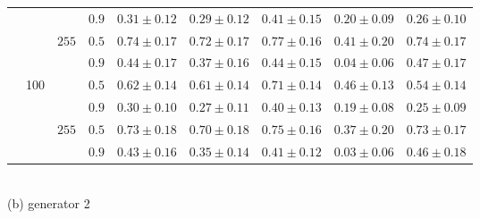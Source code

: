 \documentclass[graybox]{svmult}
\begin{document}
\begin{table}
\begin{tabular}{c|c|c|c|ccccc}
&&& $0.9$ & $0.31\pm0.12$ & $0.29\pm0.12$ & $\bm{0.41\pm0.15}$ & $0.20\pm0.09$ & $0.26\pm0.10$ \\\cline{3-9}
&& \multirow{3}{*}{$255$}
  & $0.5$ & $0.74\pm0.17$ & $0.72\pm0.17$ & $\bm{0.77\pm0.16}$ & $0.41\pm0.20$ & $0.74\pm0.17$ \\
&&& $0.9$ & $0.44\pm0.17$ & $0.37\pm0.16$ & $0.44\pm0.15$ & $0.04\pm0.06$ & $\bm{0.47\pm0.17}$ \\\cline{2-9}
&\multirow{6}{*}{100}
& \multirow{3}{*}{$9$}
  & $0.5$ & $0.62\pm0.14$ & $0.61\pm0.14$ & $\bm{0.71\pm0.14}$ & $0.46\pm0.13$ & $0.54\pm0.14$ \\
&&& $0.9$ & $0.30\pm0.10$ & $0.27\pm0.11$ & $\bm{0.40\pm0.13}$ & $0.19\pm0.08$ & $0.25\pm0.09$ \\\cline{3-9}
&& \multirow{3}{*}{$255$}
  & $0.5$ & $0.73\pm0.18$ & $0.70\pm0.18$ & $\bm{0.75\pm0.16}$ & $0.37\pm0.20$ & $0.73\pm0.17$ \\
&&& $0.9$ & $0.43\pm0.16$ & $0.35\pm0.14$ & $0.41\pm0.12$ & $0.03\pm0.06$ & $\bm{0.46\pm0.18}$ \\
\bottomrule[1.5pt]
\end{tabular}
\\(b) generator 2
\end{table}
\end{document}
